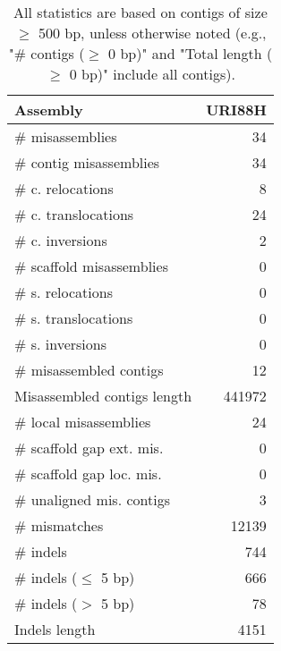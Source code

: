 \documentclass[12pt,a4paper]{article}
\begin{document}
\begin{table}[ht]
\begin{center}
\caption{All statistics are based on contigs of size $\geq$ 500 bp, unless otherwise noted (e.g., "\# contigs ($\geq$ 0 bp)" and "Total length ($\geq$ 0 bp)" include all contigs).}
\begin{tabular}{|l*{1}{|r}|}
\hline
Assembly & URI88H \\ \hline
\# misassemblies & 34 \\ \hline
\hspace{2mm}\# contig misassemblies & 34 \\ \hline
\hspace{5mm}\# c. relocations & 8 \\ \hline
\hspace{5mm}\# c. translocations & 24 \\ \hline
\hspace{5mm}\# c. inversions & 2 \\ \hline
\hspace{2mm}\# scaffold misassemblies & 0 \\ \hline
\hspace{5mm}\# s. relocations & 0 \\ \hline
\hspace{5mm}\# s. translocations & 0 \\ \hline
\hspace{5mm}\# s. inversions & 0 \\ \hline
\# misassembled contigs & 12 \\ \hline
Misassembled contigs length & 441972 \\ \hline
\# local misassemblies & 24 \\ \hline
\# scaffold gap ext. mis. & 0 \\ \hline
\# scaffold gap loc. mis. & 0 \\ \hline
\# unaligned mis. contigs & 3 \\ \hline
\# mismatches & 12139 \\ \hline
\# indels & 744 \\ \hline
\hspace{5mm}\# indels ($\leq$ 5 bp) & 666 \\ \hline
\hspace{5mm}\# indels ($>$ 5 bp) & 78 \\ \hline
Indels length & 4151 \\ \hline
\end{tabular}
\end{center}
\end{table}
\end{document}
